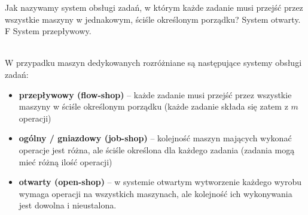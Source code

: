 \answer
{Jak nazywamy system obsługi zadań, w którym każde zadanie musi przejść przez wszystkie maszyny w jednakowym, ściśle określonym porządku?}
{System otwarty.}
{F}
{System przepływowy.}
{ \\
W przypadku maszyn dedykowanych rozróżniane są następujące systemy obsługi zadań:
\begin{itemize}
\item \textbf{przepływowy (flow-shop)} -- każde zadanie musi przejść przez wszystkie maszyny w ściśle określonym porządku (każde zadanie składa się zatem z $m$ operacji)
\item \textbf{ogólny / gniazdowy (job-shop)} -- kolejność maszyn mających wykonać operacje jest różna, ale ściśle określona dla każdego zadania (zadania mogą mieć różną ilość operacji)
\item \textbf{otwarty (open-shop)} -- w systemie otwartym wytworzenie każdego wyrobu wymaga operacji na wszystkich maszynach, ale kolejność ich wykonywania jest dowolna i nieustalona.
\end{itemize}
}




